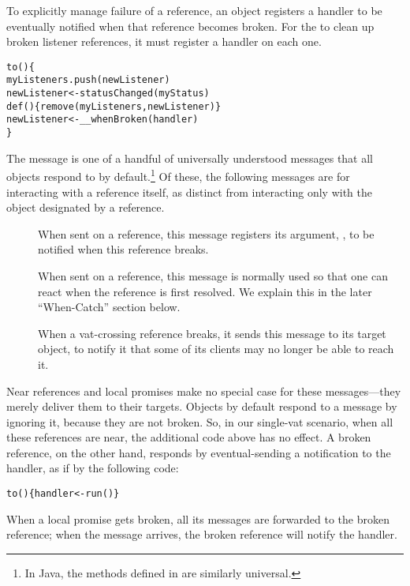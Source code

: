 \documentclass{llncs}
\begin{document}
To explicitly manage failure of a reference, an object registers a
handler to be eventually notified when that reference becomes
broken. For the  to clean up broken listener
references, it must register a handler on each one.
% 
\begin{alltt}
    to () \{
        myListeners.push(newListener)
        newListener <- statusChanged(myStatus)
        def (\dvar{}) \{ remove(myListeners, newListener) \}
        newListener <- \_\_whenBroken(handler)
    \}
\end{alltt}
%
The  message is one of a handful of universally
understood messages that all objects respond to by default.\footnote{
%
In Java, the methods defined in  are similarly
universal.}
%
Of these, the following messages are for interacting with a reference
itself, as distinct from interacting only with the object designated
by a reference.
%
\begin{description}
\item[] When sent on a reference,
  this message registers its argument, , to be notified
  when this reference breaks.
\item[] When sent on a
  reference, this message is normally used so that one can react when
  the reference is first resolved. We explain this in the later
  ``When-Catch'' section below.
\item[] When a
  vat-crossing reference breaks, it sends this message to its target
  object, to notify it that some of its clients may no longer be able
  to reach it.
\end{description}
%
Near references and local promises make no special case for these
messages---they merely deliver them to their targets. Objects by
default respond to a  message by ignoring it,
because they are not broken. So, in our single-vat scenario, when all
these references are near, the additional code above has no effect. A
broken reference, on the other hand, responds by eventual-sending
a notification to the handler, as if by the following code:
%
\begin{alltt}
    to () \{ handler <- run() \}
\end{alltt}
%
When a local promise gets broken, all its messages are forwarded to
the broken reference; when the  message arrives, the
broken reference will notify the handler.
\end{document}

